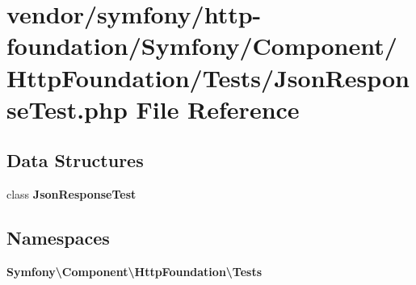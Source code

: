 \section{vendor/symfony/http-\/foundation/\+Symfony/\+Component/\+Http\+Foundation/\+Tests/\+Json\+Response\+Test.php File Reference}
\label{_json_response_test_8php}
\subsection*{Data Structures}
\begin{DoxyCompactItemize}
\item 
class {\bf Json\+Response\+Test}
\end{DoxyCompactItemize}
\subsection*{Namespaces}
\begin{DoxyCompactItemize}
\item 
 {\bf Symfony\textbackslash{}\+Component\textbackslash{}\+Http\+Foundation\textbackslash{}\+Tests}
\end{DoxyCompactItemize}
